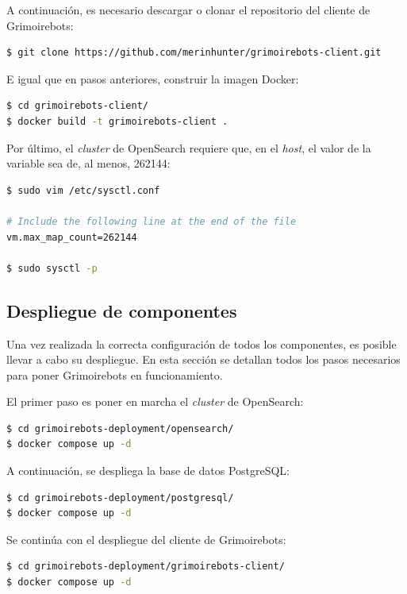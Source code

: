 A continuación, es necesario descargar o clonar el repositorio del cliente de Grimoirebots:

\begin{lstlisting}[language=bash]
$ git clone https://github.com/merinhunter/grimoirebots-client.git
\end{lstlisting}

E igual que en pasos anteriores, construir la imagen Docker:

\begin{lstlisting}[language=bash]
$ cd grimoirebots-client/
$ docker build -t grimoirebots-client .
\end{lstlisting}

Por último, el \emph{cluster} de OpenSearch requiere que, en el \emph{host}, el valor de la variable  sea de, al menos, 262144:

\begin{lstlisting}[language=bash]
$ sudo vim /etc/sysctl.conf

# Include the following line at the end of the file
vm.max_map_count=262144

$ sudo sysctl -p
\end{lstlisting}

\subsection{Despliegue de componentes}

Una vez realizada la correcta configuración de todos los componentes, es posible llevar a cabo su despliegue. En esta sección se detallan todos los pasos necesarios para poner Grimoirebots en funcionamiento.

El primer paso es poner en marcha el \emph{cluster} de OpenSearch\index{}:

\begin{lstlisting}[language=bash]
$ cd grimoirebots-deployment/opensearch/
$ docker compose up -d
\end{lstlisting}

A continuación, se despliega la base de datos PostgreSQL\index{}:

\begin{lstlisting}[language=bash]
$ cd grimoirebots-deployment/postgresql/
$ docker compose up -d
\end{lstlisting}

Se continúa con el despliegue del cliente de Grimoirebots:

\begin{lstlisting}[language=bash]
$ cd grimoirebots-deployment/grimoirebots-client/
$ docker compose up -d
\end{lstlisting}

